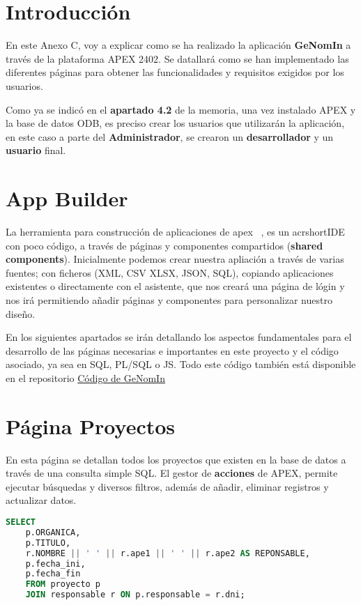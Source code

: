 \section{Introducción}
En este Anexo C, voy a explicar como se ha realizado la aplicación \textbf{GeNomIn} a través de la plataforma \acrfull{APEX} 2402.
Se datallará como se han implementado las diferentes páginas para obtener las funcionalidades y requisitos exigidos por los usuarios.

Como ya se indicó en el \textbf{apartado 4.2} de la memoria, una vez instalado \acrshort{APEX} y la base de datos \acrfull{ODB}, es preciso crear los usuarios que utilizarán la aplicación, en este caso a parte del \textbf{Administrador}, se crearon un \textbf{desarrollador} y un \textbf{usuario} final.

\section{App Builder}
La herramienta para construcción de aplicaciones de apex ~\cite{OracleAPEXAdministration}, es un acrshort{IDE} con poco código, a través de páginas y componentes compartidos (\textbf{shared components}).
Inicialmente podemos crear nuestra apliación a través de varias fuentes; con ficheros (XML, CSV XLSX, JSON, SQL), copiando aplicaciones existentes o directamente con el asistente, que nos creará una página de lógin y nos irá permitiendo añadir páginas y componentes para personalizar nuestro diseño.

En los siguientes apartados se irán detallando los aspectos fundamentales para el desarrollo de las páginas necesarias e importantes en este proyecto y el código asociado, ya sea en \acrshort{SQL}, \acrshort{PL/SQL} o \acrshort{JS}. Todo este código también está disponible en el repositorio \href{https://github.com/far0010/TFGUBU-Fran_Arroyo/tree/main/project-docs/memoria/sql}{Código de GeNomIn}

\section{Página Proyectos}
En esta página se detallan todos los proyectos que existen en la base de datos a través de una consulta simple \acrshort{SQL}. El gestor de \textbf{acciones} de \acrshort{APEX}, permite ejecutar búsquedas y diversos filtros, además de añadir, eliminar registros y actualizar datos.
\begin{lstlisting}[language=SQL, caption={Informe de todos los Proyectos}]
	SELECT 
	p.ORGANICA, 
	p.TITULO, 
	r.NOMBRE || ' ' || r.ape1 || ' ' || r.ape2 AS REPONSABLE,
	p.fecha_ini, 
	p.fecha_fin  
	FROM proyecto p
	JOIN responsable r ON p.responsable = r.dni;
\end{lstlisting}


